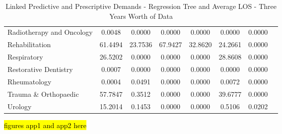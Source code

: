 \documentclass[thesis.tex]{subfiles}
\begin{document}
\begin{table}[h!]
{\begin{tabular}{lccccccc}
Radiotherapy and Oncology&	0.0048&	0.0000&	0.0000&	0.0000&	0.0000&	0.0000\\
Rehabilitation	&61.4494&	23.7536&	67.9427&	32.8620&	24.2661&	0.0000\\
Respiratory	&26.5202&	0.0000&	0.0000&	0.0000&	28.8608&	0.0000\\
Restorative Dentistry	&0.0007&	0.0000&	0.0000&	0.0000&	0.0000&	0.0000\\
Rheumatology	&0.0004&	0.0491&	0.0000&	0.0000&	0.0072&	0.0000\\
Trauma \& Orthopaedic&	57.7847&	0.3512&	0.0000&	0.0000&	39.6777&	0.0000\\
Urology	&15.2014&	0.1453&	0.0000&	0.0000&	0.5106&	0.0202\\
\bottomrule

    \end{tabular}}
    \caption{Linked Predictive and Prescriptive Demands - Regression Tree and Average LOS - Three Years Worth of Data}
    \label{apptab:LinkedDemands1}
\end{table}

\hl{figures app1 and app2 here}
\end{document}
